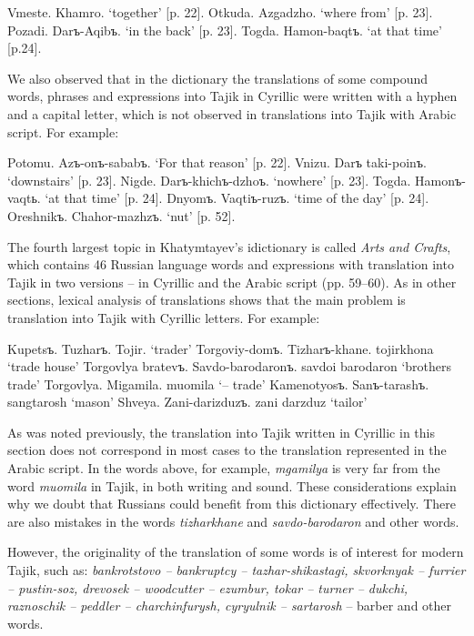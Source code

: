 \documentclass[output=paper,colorlinks,citecolor=brown,arabicfont,chinesefont]{langscibook}
\begin{document}
\ea
    \ea Vmeste. 	Khamro.
        \glt `together' 		 [p. 22].
    \ex Otkuda. 	Azgadzho.
        \glt `where from' 	 [p. 23].
    \ex Pozadi. 	Darъ-Aqibъ.
        \glt `in the back'  	 [p. 23].
    \ex Togda. 	Hamon-baqtъ.
        \glt `at that time'  	 [p.24].
    \z
\z

We also observed that in the dictionary the translations of some compound words, phrases and expressions into Tajik in Cyrillic were written with a hyphen and a capital letter, which is not observed in translations into Tajik with Arabic script. For example:

\ea
    \ea Potomu. 	Azъ-onъ-sababъ.
        \glt `For that reason' 	[p. 22].
    \ex Vnizu. 	Darъ taki-poinъ.
        \glt `downstairs'  	[p. 23].
    \ex Nigde. 	Darъ-khichъ-dzhoъ.
        \glt `nowhere'  	[p. 23].
    \ex Togda.  	Hamonъ-vaqtь.
        \glt `at that time'  	[p. 24].
    \ex Dnyomъ. 	Vaqtiъ-ruzъ.
        \glt `time of the day' 		[p. 24].
    \ex Oreshnikъ.  Chahor-mazhzъ.
        \glt `nut'  	[p. 52].
    \z
\z

The fourth largest topic in Khatymtayev's idictionary is called \emph{Arts and Crafts}, which contains 46 Russian language words and expressions with translation into Tajik in two versions – in Cyrillic and the Arabic script (pp. 59--60). As in other sections, lexical analysis of translations shows that the main problem is translation into Tajik with Cyrillic letters. For example:

\ea
   \ea Kupetsъ.		          Tuzharъ.  Tojir.
       \glt `trader'  		
   \ex Torgoviy-domъ. 		Tizharъ-khane.	tojirkhona
       \glt `trade house'  
   \ex Torgovlya bratevъ.   	Savdo-barodaronъ. 	savdoi barodaron
       \glt `brothers trade'  
   \ex Torgovlya. 			Migamila. 			muomila
       \glt `– trade'  
   \ex Kamenotyosъ. 		Sanъ-tarashъ. 		sangtarosh
       \glt `mason'  
   \ex Shveya. 			Zani-darizduzъ. 	 	zani darzduz
       \glt `tailor'  
   \z
\z

As was noted previously, the translation into Tajik written in Cyrillic in this section does not correspond in most cases to the translation represented in the Arabic script. In the words above, for example, \textit{mgamilya} is very far from the word \textit{muomila} in Tajik, in both writing and sound. These considerations explain why we doubt that Russians could benefit from this dictionary effectively. There are also mistakes in the words \textit{tizharkhane} and \textit{savdo-barodaron} and other words.

However, the originality of the translation of some words is of interest for modern Tajik, such as: \emph{bankrotstovo – bankruptcy – tazhar-shikastagi,  skvorknyak – furrier – pustin-soz, drevosek – woodcutter – ezumbur, tokar – turner – dukchi, raznoschik – peddler – charchinfurysh, cyryulnik – sartarosh} – barber and other words. 
\end{document}
